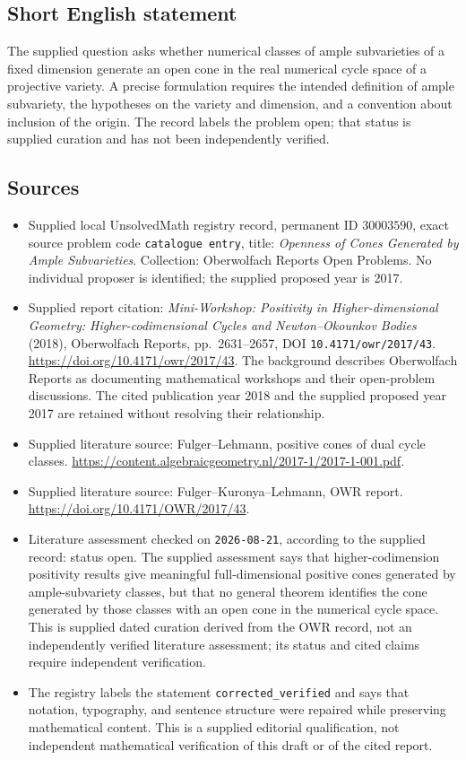 \documentclass[11pt]{article}
\begin{document}
\subsection{Short English statement}
The supplied question asks whether numerical classes of ample subvarieties of a fixed dimension generate an open cone in the real numerical cycle space of a projective variety. A precise formulation requires the intended definition of ample subvariety, the hypotheses on the variety and dimension, and a convention about inclusion of the origin. The record labels the problem open; that status is supplied curation and has not been independently verified.
\subsection{Sources}
\begin{itemize}
\item Supplied local UnsolvedMath registry record, permanent ID \(30003590\), exact source problem code \texttt{catalogue entry}, title: \emph{Openness of Cones Generated by Ample Subvarieties}. Collection: Oberwolfach Reports Open Problems. No individual proposer is identified; the supplied proposed year is 2017.
\item Supplied report citation: \emph{Mini-Workshop: Positivity in Higher-dimensional Geometry: Higher-codimensional Cycles and Newton--Okounkov Bodies} (2018), Oberwolfach Reports, pp.~2631--2657, DOI \texttt{10.4171/owr/2017/43}. \url{https://doi.org/10.4171/owr/2017/43}. The background describes Oberwolfach Reports as documenting mathematical workshops and their open-problem discussions. The cited publication year 2018 and the supplied proposed year 2017 are retained without resolving their relationship.
\item Supplied literature source: Fulger--Lehmann, positive cones of dual cycle classes. \url{https://content.algebraicgeometry.nl/2017-1/2017-1-001.pdf}.
\item Supplied literature source: Fulger--Kuronya--Lehmann, OWR report. \url{https://doi.org/10.4171/OWR/2017/43}.
\item Literature assessment checked on \texttt{2026-08-21}, according to the supplied record: status open. The supplied assessment says that higher-codimension positivity results give meaningful full-dimensional positive cones generated by ample-subvariety classes, but that no general theorem identifies the cone generated by those classes with an open cone in the numerical cycle space. This is supplied dated curation derived from the OWR record, not an independently verified literature assessment; its status and cited claims require independent verification.
\item The registry labels the statement \texttt{corrected\_verified} and says that notation, typography, and sentence structure were repaired while preserving mathematical content. This is a supplied editorial qualification, not independent mathematical verification of this draft or of the cited report.
\end{itemize}
\end{document}
